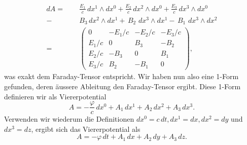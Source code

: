 \begin{align*}
	dA = \phantom{+}
	& \frac{E_1}{c} \,dx^1 \wedge dx^0 +
	\frac{E_2}{c} \,dx^2 \wedge dx^0 +
	\frac{E_3}{c} \,dx^3 \wedge dx^0
	\\
	- \, &B_3 \, dx^2 \wedge dx^1 +
	\, B_2 \, \, dx^3 \wedge dx^1 -
	\, B_1 \, \, dx^3 \wedge dx^2
	\\[2ex] 
	= \quad 
	&\begin{pmatrix}
		0 & -E_1/c & -E_2/c & -E_3/c \\ E_1/c & 0 & B_3 & -B_2 \\ E_2/c & -B_3 & 0 & B_1 \\ E_3/c & B_2 & -B_1 & 0 
	\end{pmatrix},
\end{align*}
was exakt dem Faraday-Tensor entspricht.
Wir haben nun also eine 1-Form gefunden, deren äussere Ableitung den Faraday-Tensor ergibt.
Diese 1-Form definieren wir als Viererpotential
\begin{equation}
	A = -\frac{\varphi}{c}\,dx^0 + A_1 \,dx^1 + A_2 \,dx^2 + A_3 \,dx^3.
\end{equation}
Verwenden wir wiederum die Definitionen $dx^0 = c\,dt, dx^1 = dx, dx^2 = dy$ und $dx^3 = dz$,
ergibt sich das Viererpotential als
\begin{equation}
	A = -\varphi\,dt + A_1 \,dx + A_2 \,dy + A_3 \,dz.
\end{equation}